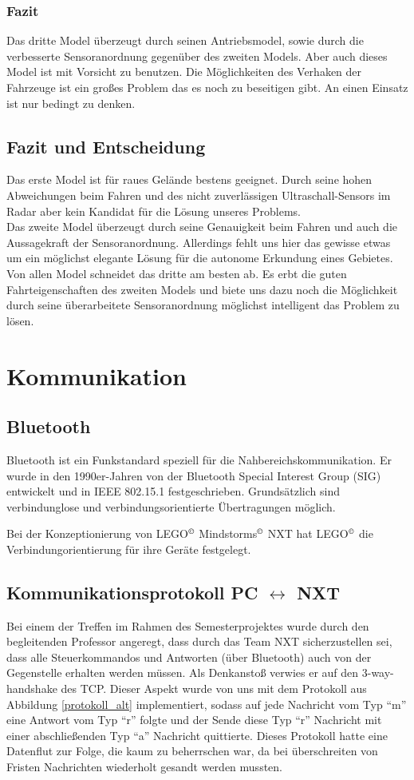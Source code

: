 \documentclass[10pt,a4paper]{scrartcl}
\begin{document}
\subsubsection{Fazit}
Das dritte Model überzeugt durch seinen Antriebsmodel, sowie durch die verbesserte Sensoranordnung gegenüber des zweiten Models. Aber auch dieses Model ist mit Vorsicht zu benutzen. Die Möglichkeiten des Verhaken der Fahrzeuge ist ein großes Problem das es noch zu beseitigen gibt. An einen Einsatz ist nur bedingt zu denken.
\subsection{Fazit und Entscheidung}
Das erste Model ist für raues Gelände bestens geeignet. Durch seine hohen Abweichungen beim Fahren und des nicht zuverlässigen Ultraschall-Sensors im Radar aber kein Kandidat für die Lösung unseres Problems.\\
Das zweite Model überzeugt durch seine Genauigkeit beim Fahren und auch die Aussagekraft der Sensoranordnung. Allerdings fehlt uns hier das gewisse etwas um ein möglichst elegante Lösung für die autonome Erkundung eines Gebietes.\\
Von allen Model schneidet das dritte am besten ab. Es erbt die guten Fahrteigenschaften des zweiten Models und biete uns dazu noch die Möglichkeit durch seine überarbeitete Sensoranordnung möglichst intelligent das Problem zu lösen. 
\section{Kommunikation}
\subsection{Bluetooth}
Bluetooth ist ein Funkstandard speziell für die Nahbereichskommunikation. Er wurde in den 1990er-Jahren von der Bluetooth Special Interest Group (SIG) entwickelt und in IEEE 802.15.1 festgeschrieben. Grundsätzlich sind verbindunglose und verbindungsorientierte Übertragungen möglich. 

Bei der Konzeptionierung von LEGO$^\copyright$ Mindstorms$^\copyright$ NXT hat LEGO$^\copyright$ die Verbindungorientierung für ihre Geräte festgelegt. 
\subsection{Kommunikationsprotokoll PC $\leftrightarrow$ NXT}
Bei einem der Treffen im Rahmen des Semesterprojektes wurde durch den begleitenden Professor  angeregt, dass durch das Team NXT sicherzustellen sei, dass alle Steuerkommandos und Antworten (über Bluetooth) auch von der Gegenstelle erhalten werden müssen. Als Denkanstoß verwies er auf den 3-way-handshake des TCP. Dieser Aspekt wurde von uns mit dem Protokoll aus Abbildung \ref{protokoll_alt} implementiert, sodass auf jede Nachricht vom Typ "`m"' eine Antwort vom Typ "`r"' folgte und der Sende diese Typ "`r"' Nachricht mit einer abschließenden Typ "`a"' Nachricht quittierte. Dieses Protokoll hatte eine Datenflut zur Folge, die kaum zu beherrschen war, da bei überschreiten von Fristen Nachrichten wiederholt gesandt werden mussten. 
\end{document}
